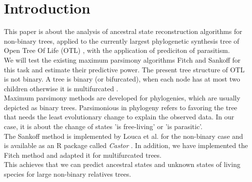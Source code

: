 \tableofcontents
\clearpage

\chapter{Introduction}
  This paper is about the analysis of ancestral state reconstruction algorithms for non-binary trees, 
    applied to the currently largest phylogenetic synthesis tree of Open Tree Of Life (OTL)
    \cite{Hinchliff2015}, with the application of prediciton of parasitism. \\

  We will test the existing maximum parsimony algorithms Fitch \cite{Fitch1971} and Sankoff 
    \cite{Sankoff1975} for this task and estimate their predictive power. The present tree structure 
    of OTL is not binary. A tree is binary (or bifurcated), when each node has at most two children 
    otherwise it is multifurcated \cite{Felsenstein2003}. \\
  Maximum parsimony methods are developed for phylogenies, which are usually depicted as binary trees.
    Parsimonious in phylogeny refers to favoring the tree that needs the least evolutionary change 
    to explain the observed data. In our case, it is about the change of states 'is free-living' or 
    'is parasitic'. \\
  The Sankoff method is implemented by Louca et al. for the non-binary case and is available as an R 
    package called \textit{Castor} \cite{Louca2017}. In addition, we have implemented the Fitch 
    method and adapted it for multifurcated trees. \\%
  This achieves that we can predict ancestral states and unknown states of living species for large 
    non-binary relatives trees. \\

